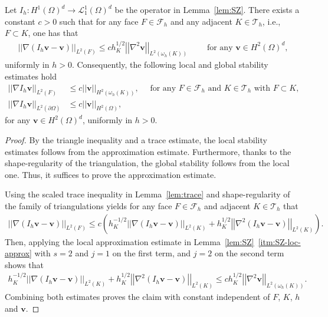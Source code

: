 \documentclass[reqno,a4paper]{amsart}
\def\norm#1{\left|\!\left| #1 \right|\!\right|}
\def\vec#1{\boldsymbol{#1}}
\def\bv{\vec{v}}
\def\tria{\mathcal{T}_h}
\def\faces{\mathcal{F}_h}
\def\PiSZ{{I_h}}
\begin{document}
\begin{corollary}\label{cor:SZ-stab}
	Let $\PiSZ \colon H^1(\Omega)^d \to \mathcal{L}^1_1(\Omega)^d$ be the operator in Lemma~\ref{lem:SZ}. 
	There exists a constant $c>0$ such that for any face $F \in \faces$ and any adjacent $K \in \tria$, i.e., $F \subset K$, one has that 
	\begin{align*}
		\norm{\nabla (\PiSZ \bv - \bv)}_{L^2(F)} \leq c h_{K}^{1/2} \norm{\nabla^2 \bv}_{L^2(\omega_h(K))}  \qquad \text{ for any } \bv \in H^2(\Omega)^d,
	\end{align*}
	uniformly in $h>0$. 
	Consequently, the following local and global stability estimates hold
	\begin{align*}
		\norm{\nabla \PiSZ \bv }_{L^2(F)} &\leq c  \norm{ \bv}_{H^2(\omega_h(K))}, %
		\quad \text{ for any } F \in \faces \text{ and  } K \in \tria \text{ with } F \subset K,	\\
		\norm{\nabla \PiSZ \bv }_{L^2(\partial \Omega)} &\leq c  \norm{ \bv}_{H^2(\Omega)},
	\end{align*}
	for any $\bv \in H^2(\Omega)^d$, uniformly in $h>0$. 
\end{corollary}
\begin{proof}
	By the triangle inequality and a trace estimate, the local stability estimates follows from the approximation estimate. 
	Furthermore, thanks to the shape-regularity of the triangulation, the global stability follows from the local one. 
	Thus, it suffices to prove the approximation estimate. 
	
	Using the scaled trace inequality in Lemma~\ref{lem:trace} and shape-regularity of the family of triangulations yields for any face $F \in \faces$ and adjacent $K \in \tria$ that 
	\begin{align*}
		\norm{\nabla(\PiSZ \bv - \bv)}_{L^2(F)}
		\leq c \left( h_{K}^{-1/2} \norm{\nabla (\PiSZ \bv - \bv)}_{L^2(K)} +  h_{K}^{1/2} \norm{\nabla^2 (\PiSZ \bv - \bv)}_{L^2(K)}
		\right). 
	\end{align*}
	Then, applying the local approximation estimate in Lemma~\ref{lem:SZ}~\ref{itm:SZ-loc-approx} with $s = 2$ and $j = 1$ on the first term, and $j = 2$ on the second term shows that
	\begin{align*}
		h_{K}^{-1/2} \norm{\nabla (\PiSZ \bv - \bv)}_{L^2(K)} +  h_{K}^{1/2} \norm{\nabla^2 (\PiSZ \bv - \bv)}_{L^2(K)}
		\leq c h_K^{1/2} \norm{\nabla^2 \bv}_{L^2(\omega_h(K))}. 
	\end{align*}
	Combining both estimates proves the claim with constant independent of $F$, $K$, $h$ and $\bv$.
\end{proof}
\end{document}
